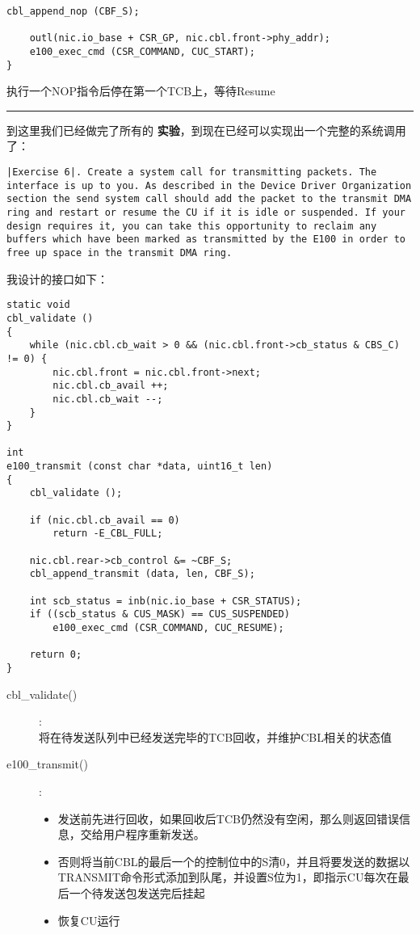 \documentclass{article}
\newcommand{\highlight}[1]{{\bfseries \color{red}  #1}}
\begin{document}
\begin{CJK*}{UTF8}{gkai}
\begin{lstlisting}[style=ccode, title={\scriptsize \ttfamily \bfseries kern/e100.c: cbl\_init()}]
    cbl_append_nop (CBF_S);

    outl(nic.io_base + CSR_GP, nic.cbl.front->phy_addr);
    e100_exec_cmd (CSR_COMMAND, CUC_START); 
}
\end{lstlisting}

执行一个NOP指令后停在第一个TCB上，等待Resume


\vspace{1em}
\hrule
\vspace{1em}


到这里我们已经做完了所有的\highlight{实验}，到现在已经可以实现出一个完整的系统调用了：


\begin{lstlisting}[style=exercise]
|Exercise 6|. Create a system call for transmitting packets. The interface is up to you. As described in the Device Driver Organization section the send system call should add the packet to the transmit DMA ring and restart or resume the CU if it is idle or suspended. If your design requires it, you can take this opportunity to reclaim any buffers which have been marked as transmitted by the E100 in order to free up space in the transmit DMA ring.
\end{lstlisting}

我设计的接口如下：

\begin{lstlisting}[style=ccode, title={\scriptsize \ttfamily \bfseries kern/e100.c}]
static void
cbl_validate () 
{
    while (nic.cbl.cb_wait > 0 && (nic.cbl.front->cb_status & CBS_C) != 0) {
        nic.cbl.front = nic.cbl.front->next;
        nic.cbl.cb_avail ++;
        nic.cbl.cb_wait --;
    }
}

int 
e100_transmit (const char *data, uint16_t len)
{
    cbl_validate ();

    if (nic.cbl.cb_avail == 0)
        return -E_CBL_FULL;
    
    nic.cbl.rear->cb_control &= ~CBF_S;
    cbl_append_transmit (data, len, CBF_S);

    int scb_status = inb(nic.io_base + CSR_STATUS);
    if ((scb_status & CUS_MASK) == CUS_SUSPENDED)
        e100_exec_cmd (CSR_COMMAND, CUC_RESUME); 

    return 0;
}
\end{lstlisting}

\label{cususpend}

\begin{description}
\item[cbl\_validate()]:\\
将在待发送队列中已经发送完毕的TCB回收，并维护CBL相关的状态值
\item[e100\_transmit()]:
\begin{itemize}
\item{发送前先进行回收，如果回收后TCB仍然没有空闲，那么则返回错误信息，交给用户程序重新发送。}
\item{否则将当前CBL的最后一个的控制位中的S清0，并且将要发送的数据以TRANSMIT命令形式添加到队尾，并设置S位为1，即指示CU每次在最后一个待发送包发送完后挂起}
\item{恢复CU运行}


\end{itemize}
\end{description}
\end{CJK*}
\end{document}
